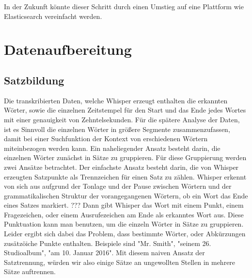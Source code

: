 In der Zukunft könnte dieser Schritt durch einen Umstieg auf eine Plattform wie Elasticsearch vereinfacht werden.






\section{Datenaufbereitung}

\subsection{Satzbildung}

Die transkribierten Daten, welche Whisper erzeugt enthalten die erkannten Wörter, sowie die einzelnen Zeitstempel für den Start und das Ende jedes Wortes mit einer genauigkeit von Zehntelsekunden.
Für die spätere Analyse der Daten, ist es Sinnvoll die einzelnen Wörter in größere Segmente zusammenzufassen, damit bei einer Suchfunktion der Kontext von erschiedenen Wörtern miteinbezogen werden kann.
Ein naheliegender Ansatz besteht darin, die einzelnen Wörter zunächst in Sätze zu gruppieren.
Für diese Gruppierung werden zwei Ansätze betrachtet.
Der einfachste Ansatz besteht darin, die von Whisper erzeugten Satzpunkte als  Trennzeichen für einen Satz zu zählen.
Whisper erkennt von sich aus aufgrund der Tonlage und der Pause zwischen Wörtern und der grammatikalischen Struktur der vorangegangenen Wörtern, ob ein Wort das Ende eines Satzes markiert. ???
Dann gibt Whisper das Wort mit einem Punkt, einem Fragezeichen, oder einem Ausrufezeichen am Ende als erkanntes Wort aus.
Diese Punktuation kann man benutzen, um die einzeln Wörter in Sätze zu gruppieren.
Leider ergibt sich dabei das Problem, dass bestimmte Wörter, oder Abkürzungen zusätzöiche Punkte enthalten.
Beispiele sind "Mr. Smith", "seinem 26. Studioalbum", "am 10. Januar 2016".
Mit diesem naiven Ansatz der Satztrennung, würden wir also einige Sätze an ungewollten Stellen in mehrere Sätze auftrennen.

